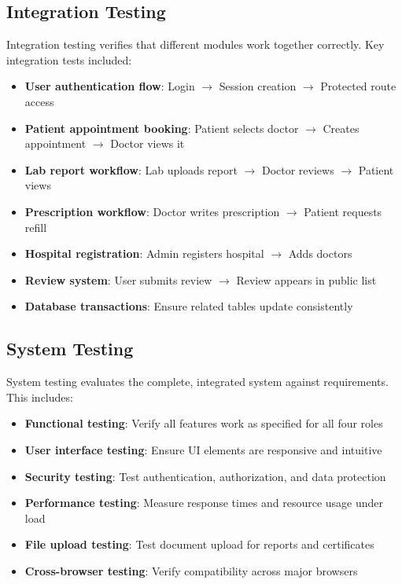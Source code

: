 \subsection{Integration Testing}
Integration testing verifies that different modules work together correctly. Key integration tests included:

\begin{itemize}
    \item \textbf{User authentication flow}: Login $\rightarrow$ Session creation $\rightarrow$ Protected route access
    \item \textbf{Patient appointment booking}: Patient selects doctor $\rightarrow$ Creates appointment $\rightarrow$ Doctor views it
    \item \textbf{Lab report workflow}: Lab uploads report $\rightarrow$ Doctor reviews $\rightarrow$ Patient views
    \item \textbf{Prescription workflow}: Doctor writes prescription $\rightarrow$ Patient requests refill
    \item \textbf{Hospital registration}: Admin registers hospital $\rightarrow$ Adds doctors
    \item \textbf{Review system}: User submits review $\rightarrow$ Review appears in public list
    \item \textbf{Database transactions}: Ensure related tables update consistently
\end{itemize}

\subsection{System Testing}
System testing evaluates the complete, integrated system against requirements. This includes:

\begin{itemize}
    \item \textbf{Functional testing}: Verify all features work as specified for all four roles
    \item \textbf{User interface testing}: Ensure UI elements are responsive and intuitive
    \item \textbf{Security testing}: Test authentication, authorization, and data protection
    \item \textbf{Performance testing}: Measure response times and resource usage under load
    \item \textbf{File upload testing}: Test document upload for reports and certificates
    \item \textbf{Cross-browser testing}: Verify compatibility across major browsers
\end{itemize}

